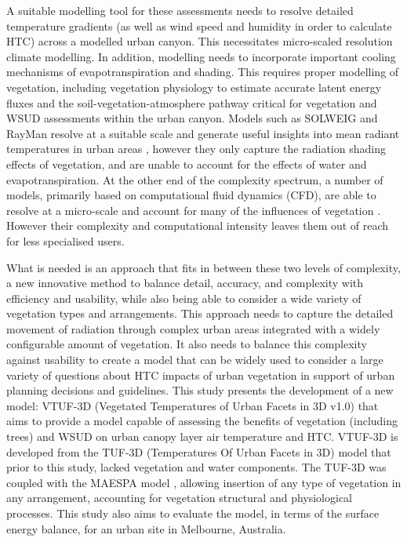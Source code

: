 \documentclass[final,3p,times,authoryear]{elsarticle}
\begin{document}
A suitable modelling tool for these assessments needs to resolve detailed temperature gradients (as well as wind speed and humidity in order to calculate HTC) across a modelled urban canyon. This necessitates micro-scaled resolution climate modelling. In addition, modelling needs to incorporate important cooling mechanisms of evapotranspiration and shading. This requires proper modelling of vegetation, including vegetation physiology to estimate accurate latent energy fluxes and the soil-vegetation-atmosphere pathway critical for vegetation and WSUD assessments within the urban canyon. Models such as SOLWEIG \citep{SOLWEIG2011} and RayMan \citep{Matzarakis2007,Matzarakis2010} resolve at a suitable scale and generate useful insights into mean radiant temperatures in urban areas \citep{Chen2014a}, however they only capture the radiation shading effects of vegetation, and are unable to account for the effects of water and evapotranspiration. At the other end of the complexity spectrum, a number of models, primarily based on computational fluid dynamics (CFD), are able to resolve at a micro-scale and account for many of the influences of vegetation \citep{Bailey2014,Bailey2016,Kunz2000,Schlunzen2011a,Yamada2011,Bruse1999}. However their complexity and computational intensity leaves them out of reach for less specialised users.


What is needed is an approach that fits in between these two levels of complexity, a new innovative method to balance detail, accuracy, and complexity with efficiency and usability, while also being able to consider a wide variety of vegetation types and arrangements. This approach needs to capture the detailed movement of radiation through complex urban areas integrated with a widely configurable amount of vegetation. It also needs to balance this complexity against usability to create a model that can be widely used to consider a large variety of questions about HTC impacts of urban vegetation in support of urban planning decisions and guidelines. This study presents the development of a new model: VTUF-3D (Vegetated Temperatures of Urban Facets in 3D v1.0) that aims to provide a model capable of assessing the benefits of vegetation (including trees) and WSUD on urban canopy layer air temperature and HTC. VTUF-3D is developed from the TUF-3D (Temperatures Of Urban Facets in 3D) model \citep{Krayenhoff2007} that prior to this study, lacked vegetation and water components. The TUF-3D was coupled with the MAESPA model \citep{Duursma2012}, allowing insertion of any type of vegetation in any arrangement, accounting for vegetation structural and physiological processes. This study also aims to evaluate the model, in terms of the surface energy balance, for an urban site in Melbourne, Australia.
\end{document}

